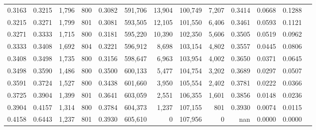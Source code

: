 \begin{tabular}{rrrrrrrrrrrrr}
0.3163 & 0.3215 &  1,796 & 800 &                                     0.3082 & 591,706 &  13,904 & 100,749 &   7,207 & 0.3414 & 0.0668 & 0.1288 \\
0.3215 & 0.3271 &  1,799 & 801 &                                     0.3081 & 593,505 &  12,105 & 101,550 &   6,406 & 0.3461 & 0.0593 & 0.1121 \\
0.3271 & 0.3333 &  1,715 & 800 &                                     0.3181 & 595,220 &  10,390 & 102,350 &   5,606 & 0.3505 & 0.0519 & 0.0962 \\
0.3333 & 0.3408 &  1,692 & 804 &                                     0.3221 & 596,912 &   8,698 & 103,154 &   4,802 & 0.3557 & 0.0445 & 0.0806 \\
0.3408 & 0.3498 &  1,735 & 800 &                                     0.3156 & 598,647 &   6,963 & 103,954 &   4,002 & 0.3650 & 0.0371 & 0.0645 \\
0.3498 & 0.3590 &  1,486 & 800 &                                     0.3500 & 600,133 &   5,477 & 104,754 &   3,202 & 0.3689 & 0.0297 & 0.0507 \\
0.3591 & 0.3724 &  1,527 & 800 &                                     0.3438 & 601,660 &   3,950 & 105,554 &   2,402 & 0.3781 & 0.0222 & 0.0366 \\
0.3725 & 0.3904 &  1,399 & 801 &                                     0.3641 & 603,059 &   2,551 & 106,355 &   1,601 & 0.3856 & 0.0148 & 0.0236 \\
0.3904 & 0.4157 &  1,314 & 800 &                                     0.3784 & 604,373 &   1,237 & 107,155 &     801 & 0.3930 & 0.0074 & 0.0115 \\
0.4158 & 0.6443 &  1,237 & 801 &                                     0.3930 & 605,610 &       0 & 107,956 &       0 &    nan & 0.0000 & 0.0000 \\
\bottomrule
\end{tabular}
